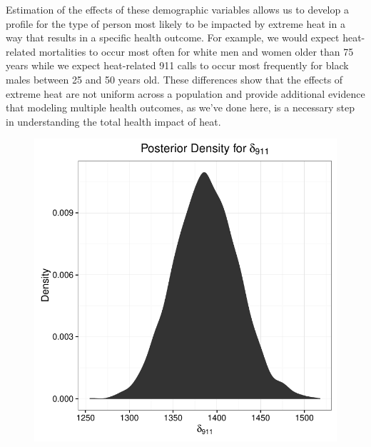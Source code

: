 \documentclass[final]{statsoc}
\begin{document}
Estimation of the effects of these demographic variables allows us to develop a profile for the type of person most likely to be impacted by extreme heat in a way that results in a specific health outcome. For example, we would expect heat-related mortalities to occur most often for white men and women older than 75 years while we expect heat-related 911 calls to occur most frequently for black males between 25 and 50 years old. These differences show that the effects of extreme heat are not uniform across a population and provide additional evidence that modeling multiple health outcomes, as we've done here, is a necessary step in understanding the total health impact of heat. 

\begin{figure}
  \centering
  \begin{minipage}{0.49\textwidth}
    \centering
    \includegraphics[width=1.0\textwidth]{./imgs/delta_911.pdf}
  \end{minipage}
  \hfill
  \begin{minipage}{0.49\textwidth}
    \centering

\end{minipage}
\end{figure}
\end{document}
